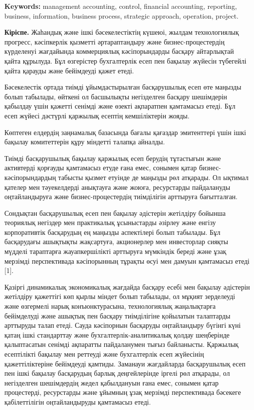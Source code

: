 {\bfseries Keywords:} management accounting, control, financial accounting,
reporting, business, information, business process, strategic approach,
operation, project.
\begin{multicols}{2}

{\bfseries Кіріспе.} Жаһандық және ішкі бәсекелестіктің күшеюі, жылдам
технологиялық прогресс, кәсіпкерлік қызметті әртараптандыру және
бизнес-процестердің күрделенуі жағдайында коммерциялық кәсіпорындарды
басқару айтарлықтай қайта құрылуда. Бұл өзгерістер бухгалтерлік есеп пен
бақылау жүйесін түбегейлі қайта қарауды және бейімдеуді қажет етеді.

Бәсекелестік ортада тиімді ұйымдастырылған басқарушылық есеп өте маңызды
болып табылады, өйткені ол басшылықты негізделген басқару шешімдерін
қабылдау үшін қажетті сенімді және өзекті ақпаратпен қамтамасыз етеді.
Бұл есеп жүйесі дәстүрлі қаржылық есептің кемшіліктерін жояды.

Көптеген елдердің заңнамалық базасында бағалы қағаздар эмитенттері үшін
ішкі бақылау комитеттерін құру міндетті талапқа айналды.

Тиімді басқарушылық бақылау қаржылық есеп берудің тұтастығын және
активтерді қорғауды қамтамасыз етуде ғана емес, сонымен қатар
бизнес-кәсіпорындардың табысты қызмет етуінде де маңызды рөл атқарады.
Ол ықтимал қателер мен тәуекелдерді анықтауға және жоюға, ресурстарды
пайдалануды оңтайландыруға және бизнес-процестердің тиімділігін
арттыруға бағытталған.

Сондықтан басқарушылық есеп пен бақылау әдістерін жетілдіру бойынша
теориялық негіздер мен практикалық ұсыныстарды әзірлеу және енгізу
корпоративтік басқарудың ең маңызды аспектілері болып табылады. Бұл
басқарудағы ашықтықты жақсартуға, акционерлер мен инвесторлар сияқты
мүдделі тараптарға жауапкершілікті арттыруға мүмкіндік береді және ұзақ
мерзімді перспективада кәсіпорынның тұрақты өсуі мен дамуын қамтамасыз
етеді {[}1{]}.

Қазіргі динамикалық экономикалық жағдайда басқару есебі мен бақылау
әдістерін жетілдіру қажеттігі көп қырлы міндет болып табылады, ол мұқият
зерделеуді және өзгермелі нарық конъюнктурасына, технологиялық
жаңалықтарға бейімделуді және ашықтық пен басқару тиімділігіне қойылатын
талаптарды арттыруды талап етеді. Сауда кәсіпорнын басқаруды
оңтайландыру бүгінгі күні қатаң ішкі стандарттау және
бухгалтерлік-аналитикалық қолдау шеңберінде қалыптасатын сенімді
ақпаратты пайдаланумен тығыз байланысты. Қаржылық есептілікті бақылау
мен реттеуді және бухгалтерлік есеп жүйесінің қажеттіліктеріне
бейімдеуді қамтиды. Заманауи жағдайларда басқарушылық есеп пен ішкі
бақылау басқарудың барлық деңгейлерінде іргелі рөл атқарады, ол
негізделген шешімдердің жедел қабылдануын ғана емес, сонымен қатар
процестерді, ресурстарды және ұйымның ұзақ мерзімді перспективада
бәсекеге қабілеттілігін оңтайландыруды қамтамасыз етеді.


\end{multicols}
